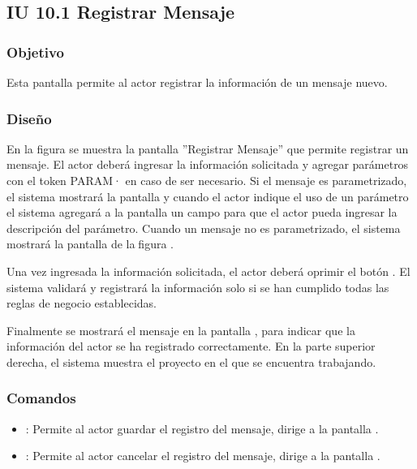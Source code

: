 \subsection{IU 10.1 Registrar Mensaje}

\subsubsection{Objetivo}
	Esta pantalla permite al actor registrar la información de un mensaje nuevo.
\subsubsection{Diseño}
	En la figura  se muestra la pantalla ''Registrar Mensaje'' que permite registrar un mensaje.
	El actor deberá ingresar la información solicitada y agregar parámetros con el token PARAM· en caso de ser necesario. Si el mensaje es parametrizado, el sistema mostrará la pantalla  y cuando el actor indique el uso de un parámetro el sistema agregará a la pantalla un campo para que el actor pueda ingresar la descripción del parámetro. Cuando un mensaje no es parametrizado, el sistema mostrará la pantalla de lafigura .
	
	Una vez ingresada la información solicitada, el actor deberá oprimir el botón  . El sistema validará y registrará la información solo si se han cumplido todas las reglas de negocio establecidas.
	
	Finalmente se mostrará el mensaje  en la pantalla , para indicar que la información del actor se ha registrado correctamente.
	En la parte superior derecha, el sistema muestra el proyecto en el que se encuentra trabajando.

\subsubsection{Comandos}
\begin{itemize}
	\item {}: Permite al actor guardar el registro del mensaje, dirige a la pantalla .
	\item {}: Permite al actor cancelar el registro del mensaje, dirige a la pantalla .
\end{itemize}

